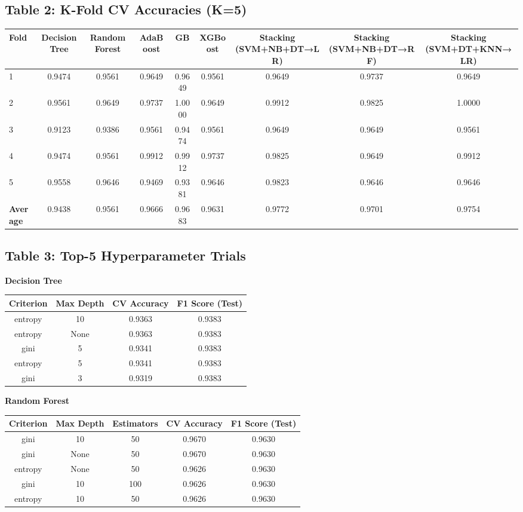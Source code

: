 \documentclass[12pt]{article}
\begin{document}
\subsection*{Table 2: K-Fold CV Accuracies (K=5)}
\begin{tabular}{|l|c|c|c|c|c|c|c|c|}
\hline
\textbf{Fold} & \textbf{Decision Tree} & \textbf{Random Forest} & \textbf{AdaBoost} & \textbf{GB} & \textbf{XGBoost} & \textbf{Stacking (SVM+NB+DT→LR)} & \textbf{Stacking (SVM+NB+DT→RF)} & \textbf{Stacking (SVM+DT+KNN→LR)} \\
\hline
1 & 0.9474 & 0.9561 & 0.9649 & 0.9649 & 0.9561 & 0.9649 & 0.9737 & 0.9649 \\
2 & 0.9561 & 0.9649 & 0.9737 & 1.0000 & 0.9649 & 0.9912 & 0.9825 & 1.0000 \\
3 & 0.9123 & 0.9386 & 0.9561 & 0.9474 & 0.9561 & 0.9649 & 0.9649 & 0.9561 \\
4 & 0.9474 & 0.9561 & 0.9912 & 0.9912 & 0.9737 & 0.9825 & 0.9649 & 0.9912 \\
5 & 0.9558 & 0.9646 & 0.9469 & 0.9381 & 0.9646 & 0.9823 & 0.9646 & 0.9646 \\
\hline
\textbf{Average} & 0.9438 & 0.9561 & 0.9666 & 0.9683 & 0.9631 & 0.9772 & 0.9701 & 0.9754 \\
\hline
\end{tabular}

\subsection*{Table 3: Top-5 Hyperparameter Trials}
\textbf{Decision Tree}
\begin{tabular}{|c|c|c|c|}
\hline
Criterion & Max Depth & CV Accuracy & F1 Score (Test) \\
\hline
entropy & 10 & 0.9363 & 0.9383 \\
entropy & None & 0.9363 & 0.9383 \\
gini & 5 & 0.9341 & 0.9383 \\
entropy & 5 & 0.9341 & 0.9383 \\
gini & 3 & 0.9319 & 0.9383 \\
\hline
\end{tabular}

\vspace{1em}
\textbf{Random Forest}
\begin{tabular}{|c|c|c|c|c|}
\hline
Criterion & Max Depth & Estimators & CV Accuracy & F1 Score (Test) \\
\hline
gini & 10 & 50 & 0.9670 & 0.9630 \\
gini & None & 50 & 0.9670 & 0.9630 \\
entropy & None & 50 & 0.9626 & 0.9630 \\
gini & 10 & 100 & 0.9626 & 0.9630 \\
entropy & 10 & 50 & 0.9626 & 0.9630 \\
\hline
\end{tabular}
\end{document}
